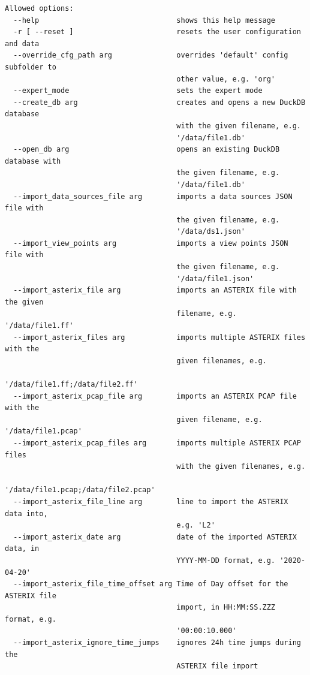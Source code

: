 \begin{lstlisting}
Allowed options:
  --help                                shows this help message
  -r [ --reset ]                        resets the user configuration and data
  --override_cfg_path arg               overrides 'default' config subfolder to
                                        other value, e.g. 'org'
  --expert_mode                         sets the expert mode
  --create_db arg                       creates and opens a new DuckDB database
                                        with the given filename, e.g.
                                        '/data/file1.db'
  --open_db arg                         opens an existing DuckDB database with
                                        the given filename, e.g.
                                        '/data/file1.db'
  --import_data_sources_file arg        imports a data sources JSON file with
                                        the given filename, e.g.
                                        '/data/ds1.json'
  --import_view_points arg              imports a view points JSON file with
                                        the given filename, e.g.
                                        '/data/file1.json'
  --import_asterix_file arg             imports an ASTERIX file with the given
                                        filename, e.g. '/data/file1.ff'
  --import_asterix_files arg            imports multiple ASTERIX files with the
                                        given filenames, e.g.
                                        '/data/file1.ff;/data/file2.ff'
  --import_asterix_pcap_file arg        imports an ASTERIX PCAP file with the
                                        given filename, e.g. '/data/file1.pcap'
  --import_asterix_pcap_files arg       imports multiple ASTERIX PCAP files
                                        with the given filenames, e.g.
                                        '/data/file1.pcap;/data/file2.pcap'
  --import_asterix_file_line arg        line to import the ASTERIX data into,
                                        e.g. 'L2'
  --import_asterix_date arg             date of the imported ASTERIX data, in
                                        YYYY-MM-DD format, e.g. '2020-04-20'
  --import_asterix_file_time_offset arg Time of Day offset for the ASTERIX file
                                        import, in HH:MM:SS.ZZZ format, e.g.
                                        '00:00:10.000'
  --import_asterix_ignore_time_jumps    ignores 24h time jumps during the
                                        ASTERIX file import

\end{lstlisting}
